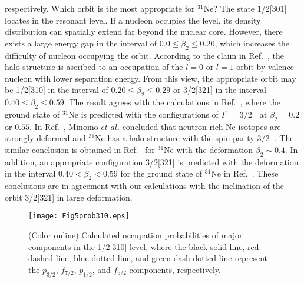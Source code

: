 \documentclass[twocolumn,prc,showpacs,preprintnumbers,superscriptaddress,floatfix]{revtex4}
\begin{document}
respectively. Which orbit is the most appropriate for $^{31}$Ne? The state
1/2[301] locates in the resonant level. If a nucleon occupies the level, its
density distribution can spatially extend far beyond the nuclear core.
However, there exists a large energy gap in the interval of $0.0\leqslant
\beta _{2}\leqslant 0.20$, which increases the difficulty of nucleon
occupying the orbit. According to the claim in Ref.~\cite{Sagawa1992}, the
halo structure is ascribed to an occupation of the $l=0$ or $l=1$ orbit by
valence nucleon with lower separation energy. From this view, the
appropriate orbit may be 1/2[310] in the interval of $0.20\leqslant \beta
_{2}\leqslant 0.29$ or 3/2[321] in the interval $0.40\leqslant \beta
_{2}\leqslant 0.59$. The result agrees with the calculations in Ref.~\cite{Urata2011,Urata2012}, where the ground state of $^{31}$Ne is predicted with the configurations of $I^{\pi}= 3/2^{-}$ at $\beta
_{2}=0.2$ or $0.55$. In Ref.~\cite%
{Minomo2011,Minomo2012}, Minomo $et$ $al$.
concluded that neutron-rich Ne isotopes are strongly deformed and $^{31}$Ne
has a halo structure with the spin parity $3/2^{-}$. The similar conclusion is obtained in Ref.~\cite{Sumi2012} for $^{31}$Ne with the deformation $\beta _{2}\sim 0.4$. In addition, an appropriate
configuration 3/2[321] is predicted with the deformation in the interval $0.40<\beta _{2}<0.59
$ for the ground state of $^{31}$Ne in Ref.~\cite{Hamamoto2010}. These conclusions are in agreement with our calculations with the inclination of the orbit 3/2[321] in large deformation.

\begin{figure}[tph]
\centering%
\texttt{[image: Fig5prob310.eps]}\centering
\caption{(Color online) Calculated occupation probabilities of major
components in the 1/2[310] level, where the black solid line, red dashed
line, blue dotted line, and green dash-dotted line represent the $p_{3/2}$, $%
f_{7/2}$, $p_{1/2}$, and $f_{5/2}$ components, respectively.}
\end{figure}
\end{document}
